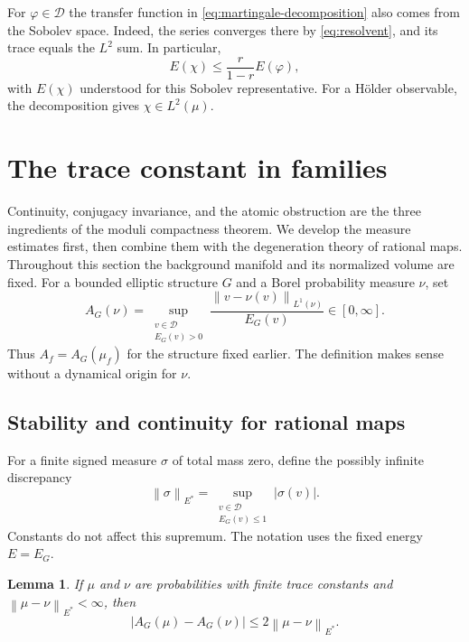\documentclass[10pt,a4paper]{amsart}
\newtheorem{lemma}[theorem]{Lemma}
\newcommand{\E}{\mathbb E}
\newcommand{\Dcal}{\mathcal D}
\newcommand{\norm}[1]{\left\lVert #1\right\rVert}
\numberwithin{equation}{section}
\begin{document}
For $\varphi\in\Dcal$ the transfer function in \eqref{eq:martingale-decomposition} also comes from the Sobolev space. Indeed, the series converges there by \eqref{eq:resolvent}, and its trace equals the $L^2$ sum. In particular,
\[
 E(\chi)\le\frac{r}{1-r}E(\varphi),
\]
with $E(\chi)$ understood for this Sobolev representative. For a H\"older observable, the decomposition gives $\chi\in L^2(\mu)$.

\section{The trace constant in families}\label{sec:families}

Continuity, conjugacy invariance, and the atomic obstruction are the three ingredients of the moduli compactness theorem. We develop the measure estimates first, then combine them with the degeneration theory of rational maps. Throughout this section the background manifold and its normalized volume are fixed. For a bounded elliptic structure $G$ and a Borel probability measure $\nu$, set
\begin{equation}\label{eq:measure-trace-constant}
 A_G(\nu)=\sup_{\substack{v\in\Dcal\\E_G(v)>0}}
 \frac{\norm{v-\nu(v)}_{L^1(\nu)}}{E_G(v)}\in[0,\infty].
\end{equation}
Thus $A_f=A_G(\mu_f)$ for the structure fixed earlier. The definition makes sense without a dynamical origin for $\nu$.

\subsection{Stability and continuity for rational maps}

For a finite signed measure $\sigma$ of total mass zero, define the possibly infinite discrepancy
\[
 \norm{\sigma}_{E^*}
 =\sup_{\substack{v\in\Dcal\\E_G(v)\le1}}|\sigma(v)|.
\]
Constants do not affect this supremum. The notation uses the fixed energy $E=E_G$.

\begin{lemma}\label{lem:trace-stability}
If $\mu$ and $\nu$ are probabilities with finite trace constants and $\norm{\mu-\nu}_{E^*}<\infty$, then
\begin{equation}\label{eq:trace-stability}
 |A_G(\mu)-A_G(\nu)|\le2\norm{\mu-\nu}_{E^*}.
\end{equation}
\end{lemma}
\end{document}
